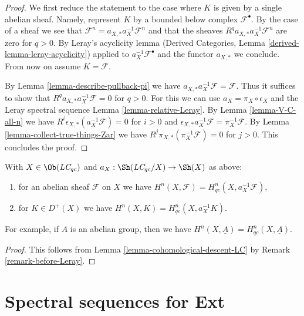 \begin{proof}
We first reduce the statement to the case where
$K$ is given by a single abelian sheaf. Namely, represent $K$
by a bounded below complex $\mathcal{F}^\bullet$. By the case of a
sheaf we see that
$\mathcal{F}^n = a_{X, *} a_X^{-1} \mathcal{F}^n$
and that the sheaves $R^qa_{X, *}a_X^{-1}\mathcal{F}^n$
are zero for $q > 0$. By Leray's acyclicity lemma
(Derived Categories, Lemma \ref{derived-lemma-leray-acyclicity})
applied to $a_X^{-1}\mathcal{F}^\bullet$
and the functor $a_{X, *}$ we conclude. From now on assume $K = \mathcal{F}$.

\medskip\noindent
By Lemma \ref{lemma-describe-pullback-pi} we have
$a_{X, *}a_X^{-1}\mathcal{F} = \mathcal{F}$. Thus it suffices to show that
$R^qa_{X, *}a_X^{-1}\mathcal{F} = 0$ for $q > 0$.
For this we can use $a_X = \pi_X \circ \epsilon_X$ and
the Leray spectral sequence Lemma \ref{lemma-relative-Leray}.
By Lemma \ref{lemma-V-C-all-n}
we have $R^i\epsilon_{X, *}(a_X^{-1}\mathcal{F}) = 0$ for $i > 0$
and $\epsilon_{X, *}a_X^{-1}\mathcal{F} = \pi_X^{-1}\mathcal{F}$.
By Lemma \ref{lemma-collect-true-things-Zar} we have
$R^j\pi_{X, *}(\pi_X^{-1}\mathcal{F}) = 0$ for $j > 0$.
This concludes the proof.
\end{proof}

\begin{lemma}
\label{lemma-compare-cohomology-LC}
With $X \in \Ob(\textit{LC}_{qc})$ and
$a_X : \Sh(\textit{LC}_{qc}/X) \to \Sh(X)$ as above:
\begin{enumerate}
\item for an abelian sheaf $\mathcal{F}$ on $X$ we have
$H^n(X, \mathcal{F}) = H^n_{qc}(X, a_X^{-1}\mathcal{F})$,
\item for $K \in D^+(X)$ we have $H^n(X, K) = H^n_{qc}(X, a_X^{-1}K)$.
\end{enumerate}
For example, if $A$ is an abelian group, then we have
$H^n(X, \underline{A}) = H^n_{qc}(X, \underline{A})$.
\end{lemma}

\begin{proof}
This follows from Lemma \ref{lemma-cohomological-descent-LC}
by Remark \ref{remark-before-Leray}.
\end{proof}











\section{Spectral sequences for Ext}
\label{section-spectral-sequence-ext}

